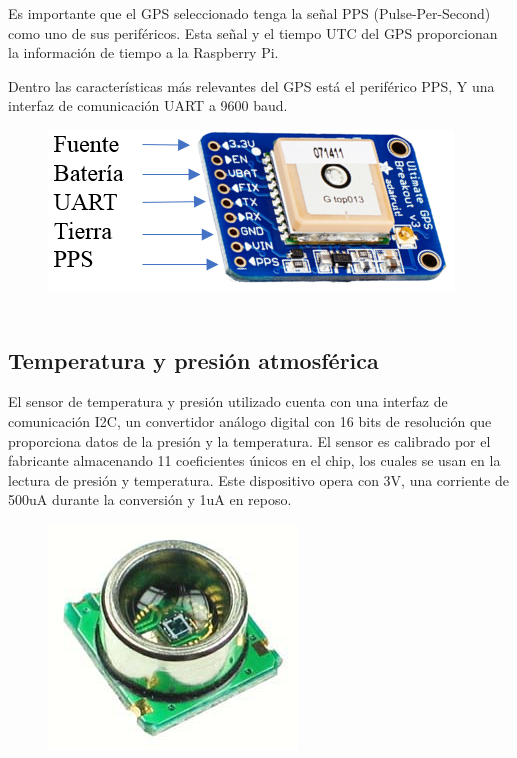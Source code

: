 Es importante que el GPS seleccionado tenga la señal PPS (Pulse-Per-Second) como uno de sus periféricos. 
Esta señal y el tiempo UTC del GPS proporcionan la información de tiempo a la Raspberry Pi.

Dentro las características más relevantes del GPS está el periférico PPS, Y una interfaz de comunicación UART a 9600 baud.

\begin{figure}[H]
\includegraphics[scale=0.85]{Figs/gps.png} 
\centering
\caption[GPS adafruit ultimate]{~\citep{Adafruit2020}}
\label{adecuacion}
\end{figure}

\subsection{Temperatura y presión atmosférica}
El sensor de temperatura y presión utilizado cuenta con una interfaz de comunicación I2C, un convertidor análogo digital con 16 bits de resolución que proporciona datos de la presión y la temperatura. 
El sensor es calibrado por el fabricante almacenando 11 coeficientes únicos en el chip, los cuales se usan en la lectura de presión y temperatura. 
Este dispositivo opera con 3V, una corriente de 500uA durante la conversión y 1uA en reposo.

\begin{figure}[H]
\includegraphics[scale=0.7]{Figs/hp03s.jpg} 
\centering
\caption[Sensor HP03S de presión y temperatura]{ ~\citep{HP03SDatasheet}}
\label{adecuacion}
\end{figure}

